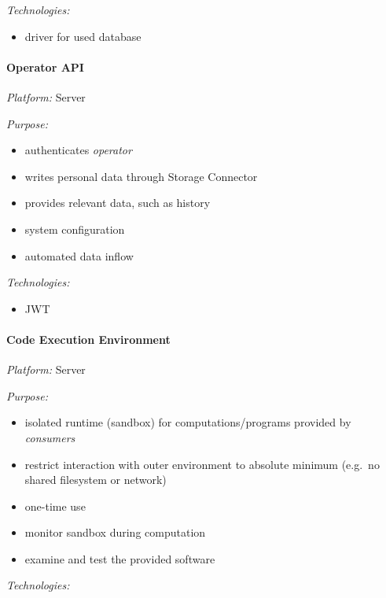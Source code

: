 \documentclass[12pt,english,a4paper,titlepage,cleardoublepage=empty,dottedtoc]{report}
\providecommand{\tightlist}{%
  \setlength{\itemsep}{0pt}\setlength{\parskip}{0pt}}
\begin{document}
\emph{Technologies:}

\begin{itemize}
\tightlist
\item
  driver for used database
\end{itemize}

\paragraph{Operator API}\label{operator-api}

\emph{Platform:} Server

\emph{Purpose:}

\begin{itemize}
\tightlist
\item
  authenticates \emph{operator}
\item
  writes personal data through Storage Connector
\item
  provides relevant data, such as history
\item
  system configuration
\item
  automated data inflow
\end{itemize}

\emph{Technologies:}

\begin{itemize}
\tightlist
\item
  JWT
\end{itemize}

\paragraph{Code Execution Environment}\label{code-execution-environment}

\emph{Platform:} Server

\emph{Purpose:}

\begin{itemize}
\tightlist
\item
  isolated runtime (sandbox) for computations/programs provided by
  \emph{consumers}
\item
  restrict interaction with outer environment to absolute minimum
  (e.g.~no shared filesystem or network)
\item
  one-time use
\item
  monitor sandbox during computation
\item
  examine and test the provided software
\end{itemize}

\emph{Technologies:}
\end{document}
